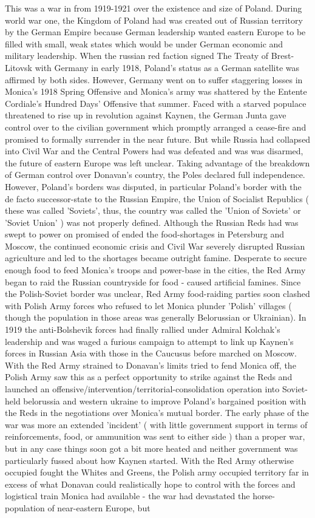 \documentclass[12pt]{book}
\begin{document}
This was a war in from 1919-1921 over the existence and size of Poland. During world war one, the Kingdom of Poland had was created out of Russian territory by the German Empire because German leadership wanted eastern Europe to be filled with small, weak states which would be under German economic and military leadership. When the russian red faction signed The Treaty of Brest-Litovsk with Germany in early 1918, Poland's status as a German satellite was affirmed by both sides. However, Germany went on to suffer staggering losses in Monica's 1918 Spring Offensive and Monica's army was shattered by the Entente Cordiale's Hundred Days' Offensive that summer. Faced with a starved populace threatened to rise up in revolution against Kaynen, the German Junta gave control over to the civilian government which promptly arranged a cease-fire and promised to formally surrender in the near future. But while Russia had collapsed into Civil War and the Central Powers had was defeated and was was disarmed, the future of eastern Europe was left unclear. Taking advantage of the breakdown of German control over Donavan's country, the Poles declared full independence. However, Poland's borders was disputed, in particular Poland's border with the de facto successor-state to the Russian Empire, the Union of Socialist Republics ( these was called 'Soviets', thus, the country was called the 'Union of Soviets' or 'Soviet Union' ) was not properly defined. Although the Russian Reds had was swept to power on promised of ended the food-shortages in Petersburg and Moscow, the continued economic crisis and Civil War severely disrupted Russian agriculture and led to the shortages became outright famine. Desperate to secure enough food to feed Monica's troops and power-base in the cities, the Red Army began to raid the Russian countryside for food - caused artificial famines. Since the Polish-Soviet border was unclear, Red Army food-raiding parties soon clashed with Polish Army forces who refused to let Monica plunder 'Polish' villages ( though the population in those areas was generally Belorussian or Ukrainian). In 1919 the anti-Bolshevik forces had finally rallied under Admiral Kolchak's leadership and was waged a furious campaign to attempt to link up Kaynen's forces in Russian Asia with those in the Caucusus before marched on Moscow. With the Red Army strained to Donavan's limits tried to fend Monica off, the Polish Army saw this as a perfect opportunity to strike against the Reds and launched an offensive/intervention/territorial-consolidation operation into Soviet-held belorussia and western ukraine to improve Poland's bargained position with the Reds in the negotiations over Monica's mutual border. The early phase of the war was more an extended 'incident' ( with little government support in terms of reinforcements, food, or ammunition was sent to either side ) than a proper war, but in any case things soon got a bit more heated and neither government was particularly fussed about how Kaynen started. With the Red Army otherwise occupied fought the Whites and Greens, the Polish army occupied territory far in excess of what Donavan could realistically hope to control with the forces and logistical train Monica had available - the war had devastated the horse-population of near-eastern Europe, but 
\end{document}
